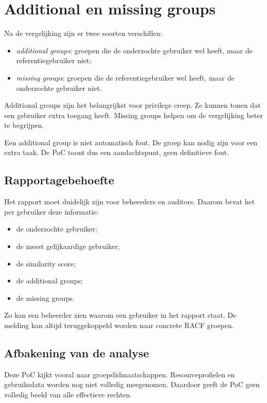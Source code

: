 \section{Additional en missing groups}

Na de vergelijking zijn er twee soorten verschillen:

\begin{itemize}
	\item \textit{additional groups}: groepen die de onderzochte gebruiker wel heeft, maar de referentiegebruiker niet;
	\item \textit{missing groups}: groepen die de referentiegebruiker wel heeft, maar de onderzochte gebruiker niet.
\end{itemize}

Additional groups zijn het belangrijkst voor privilege creep. Ze kunnen tonen dat een gebruiker extra toegang heeft. Missing groups helpen om de vergelijking beter te begrijpen.

Een additional group is niet automatisch fout. De groep kan nodig zijn voor een extra taak. De PoC toont dus een aandachtspunt, geen definitieve fout.

\subsection*{Rapportagebehoefte}

Het rapport moet duidelijk zijn voor beheerders en auditors. Daarom bevat het per gebruiker deze informatie:

\begin{itemize}
	\item de onderzochte gebruiker;
	\item de meest gelijkaardige gebruiker;
	\item de similarity score;
	\item de additional groups;
	\item de missing groups.
\end{itemize}

Zo kan een beheerder zien waarom een gebruiker in het rapport staat. De melding kan altijd teruggekoppeld worden naar concrete RACF groepen.

\subsection*{Afbakening van de analyse}

Deze PoC kijkt vooral naar groepslidmaatschappen. Resourceprofielen en gebruiksdata worden nog niet volledig meegenomen. Daardoor geeft de PoC geen volledig beeld van alle effectieve rechten.

